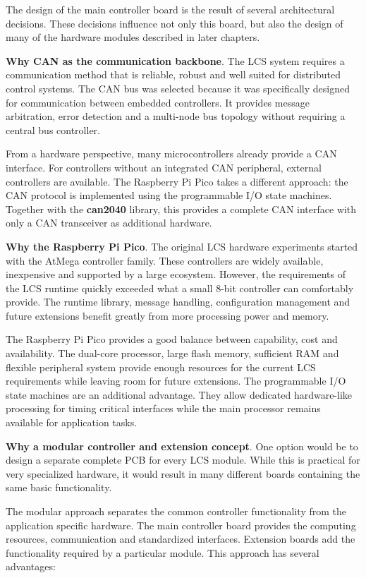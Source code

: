 The design of the main controller board is the result of several architectural
decisions. These decisions influence not only this board, but also the design
of many of the hardware modules described in later chapters.

\textbf{Why CAN as the communication backbone}. The LCS system requires a 
communication method that is reliable, robust and
well suited for distributed control systems. The CAN bus was selected because
it was specifically designed for communication between embedded controllers.
It provides message arbitration, error detection and a multi-node bus topology
without requiring a central bus controller.

From a hardware perspective, many microcontrollers already provide a CAN
interface. For controllers without an integrated CAN peripheral, external
controllers are available. The Raspberry Pi Pico takes a different approach:
the CAN protocol is implemented using the programmable I/O state machines.
Together with the \textbf{can2040} library, this provides a complete CAN
interface with only a CAN transceiver as additional hardware.

\textbf{Why the Raspberry Pi Pico}. The original LCS hardware experiments 
started with the AtMega controller family. These controllers are widely 
available, inexpensive and supported by a large ecosystem. However, the 
requirements of the LCS runtime quickly exceeded what a small
8-bit controller can comfortably provide. The runtime library, message
handling, configuration management and future extensions benefit greatly from
more processing power and memory.

The Raspberry Pi Pico provides a good balance between capability, cost and
availability. The dual-core processor, large flash memory, sufficient RAM and
flexible peripheral system provide enough resources for the current LCS
requirements while leaving room for future extensions. The programmable I/O 
state machines are an additional advantage. They allow
dedicated hardware-like processing for timing critical interfaces while the
main processor remains available for application tasks.

\textbf{Why a modular controller and extension concept}.
One option would be to design a separate complete PCB for every LCS module.
While this is practical for very specialized hardware, it would result in
many different boards containing the same basic functionality.

The modular approach separates the common controller functionality from the
application specific hardware. The main controller board provides the
computing resources, communication and standardized interfaces. Extension
boards add the functionality required by a particular module.
This approach has several advantages:

